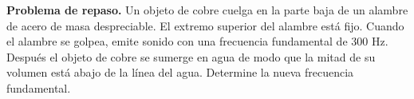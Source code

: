 \item \textbf{Problema de repaso.}
Un objeto de cobre cuelga en la parte baja de un alambre de acero de masa despreciable. El extremo superior del alambre está fijo. Cuando el alambre se golpea, emite sonido con una frecuencia fundamental de $300\text{ Hz}$. Después el objeto de cobre se sumerge en agua de modo que la mitad de su volumen está abajo de la línea del agua. Determine la nueva frecuencia fundamental.